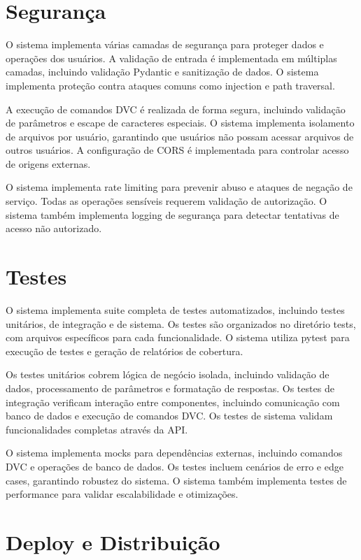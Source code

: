 \documentclass[12pt,a4paper]{article}
\begin{document}
\section{Segurança}

O sistema implementa várias camadas de segurança para proteger dados e operações dos usuários. A validação de entrada é implementada em múltiplas camadas, incluindo validação Pydantic e sanitização de dados. O sistema implementa proteção contra ataques comuns como injection e path traversal.

A execução de comandos DVC é realizada de forma segura, incluindo validação de parâmetros e escape de caracteres especiais. O sistema implementa isolamento de arquivos por usuário, garantindo que usuários não possam acessar arquivos de outros usuários. A configuração de CORS é implementada para controlar acesso de origens externas.

O sistema implementa rate limiting para prevenir abuso e ataques de negação de serviço. Todas as operações sensíveis requerem validação de autorização. O sistema também implementa logging de segurança para detectar tentativas de acesso não autorizado.

\section{Testes}

O sistema implementa suite completa de testes automatizados, incluindo testes unitários, de integração e de sistema. Os testes são organizados no diretório tests, com arquivos específicos para cada funcionalidade. O sistema utiliza pytest para execução de testes e geração de relatórios de cobertura.

Os testes unitários cobrem lógica de negócio isolada, incluindo validação de dados, processamento de parâmetros e formatação de respostas. Os testes de integração verificam interação entre componentes, incluindo comunicação com banco de dados e execução de comandos DVC. Os testes de sistema validam funcionalidades completas através da API.

O sistema implementa mocks para dependências externas, incluindo comandos DVC e operações de banco de dados. Os testes incluem cenários de erro e edge cases, garantindo robustez do sistema. O sistema também implementa testes de performance para validar escalabilidade e otimizações.

\section{Deploy e Distribuição}
\end{document}
